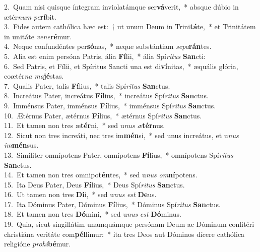 {2.~}Quam nisi quisque íntegram inviolatámque ser\textbf{vá}verit,~* absque dúbio in ætér\textit{num} \textit{pe}\textbf{rí}bit.\\
{3.~}Fides autem cathólica hæc est:~† ut unum Deum in Trini\textbf{tá}te,~* et Trinitátem in unitáte \textit{ve}\textit{ne}\textbf{ré}mur.\\
{4.~}Neque confundéntes per\textbf{só}nas,~* neque substántiam \textit{se}\textit{pa}\textbf{rán}tes.\\
{5.~}Alia est enim persóna Patris, ália \textbf{Fí}lii,~* ália Spí\textit{ri}\textit{tus} \textbf{San}cti:\\
{6.~}Sed Patris, et Fílii, et Spíritus Sancti una est di\textbf{ví}nitas,~* æquális glória, coætér\textit{na} \textit{ma}\textbf{jé}stas.\\
{7.~}Qualis Pater, talis \textbf{Fí}lius,~* talis Spí\textit{ri}\textit{tus} \textbf{San}ctus.\\
{8.~}Increátus Pater, increátus \textbf{Fí}lius,~* increátus Spí\textit{ri}\textit{tus} \textbf{San}ctus.\\
{9.~}Imménsus Pater, imménsus \textbf{Fí}lius,~* imménsus Spí\textit{ri}\textit{tus} \textbf{San}ctus.\\
{10.~}Ætérnus Pater, ætérnus \textbf{Fí}lius,~* ætérnus Spí\textit{ri}\textit{tus} \textbf{San}ctus.\\
{11.~}Et tamen non tres æ\textbf{tér}ni,~* sed u\textit{nus} \textit{æ}\textbf{tér}nus.\\
{12.~}Sicut non tres increáti, nec tres im\textbf{mén}si,~* sed unus increátus, et u\textit{nus} \textit{im}\textbf{mén}sus.\\
{13.~}Simíliter omnípotens Pater, omnípotens \textbf{Fí}lius,~* omnípotens Spí\textit{ri}\textit{tus} \textbf{San}ctus.\\
{14.~}Et tamen non tres omnipo\textbf{tén}tes,~* sed u\textit{nus} \textit{om}\textbf{ní}potens.\\
{15.~}Ita Deus Pater, Deus \textbf{Fí}lius,~* Deus Spí\textit{ri}\textit{tus} \textbf{San}ctus.\\
{16.~}Ut tamen non tres \textbf{Di}i,~* sed u\textit{nus} \textit{est} \textbf{De}us.\\
{17.~}Ita Dóminus Pater, Dóminus \textbf{Fí}lius,~* Dóminus Spí\textit{ri}\textit{tus} \textbf{San}ctus.\\
{18.~}Et tamen non tres \textbf{Dó}mini,~* sed u\textit{nus} \textit{est} \textbf{Dó}minus.\\
{19.~}Quia, sicut singillátim unamquámque persónam Deum ac Dóminum confitéri christiána veritáte com\textbf{pél}limur:~* ita tres Deos aut Dóminos dícere cathólica religióne \textit{pro}\textit{hi}\textbf{bé}mur.\\
